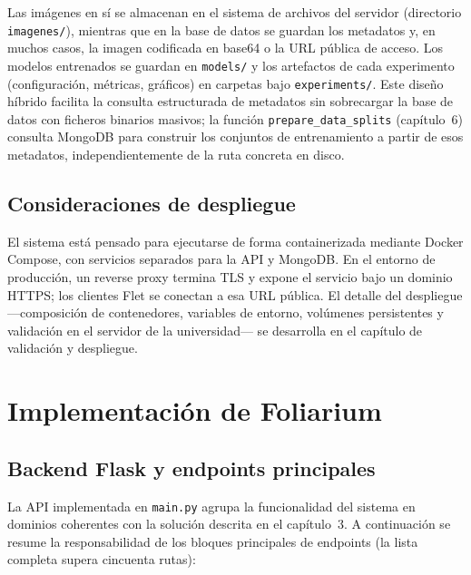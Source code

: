\documentclass[11pt,spanish,listoffigures,listoftables]{tfgetsinf}
\begin{document}
Las imágenes en sí se almacenan en el sistema de archivos del servidor (directorio \texttt{imagenes/}), mientras que en la base de datos se guardan los metadatos y, en muchos casos, la imagen codificada en base64 o la URL pública de acceso. Los modelos entrenados se guardan en \texttt{models/} y los artefactos de cada experimento (configuración, métricas, gráficos) en carpetas bajo \texttt{experiments/}. Este diseño híbrido facilita la consulta estructurada de metadatos sin sobrecargar la base de datos con ficheros binarios masivos; la función \texttt{prepare\_data\_splits} (capítulo~6) consulta MongoDB para construir los conjuntos de entrenamiento a partir de esos metadatos, independientemente de la ruta concreta en disco.

\section{Consideraciones de despliegue}

El sistema está pensado para ejecutarse de forma containerizada mediante Docker Compose, con servicios separados para la API y MongoDB. En el entorno de producción, un reverse proxy termina TLS y expone el servicio bajo un dominio HTTPS; los clientes Flet se conectan a esa URL pública. El detalle del despliegue ---composición de contenedores, variables de entorno, volúmenes persistentes y validación en el servidor de la universidad--- se desarrolla en el capítulo de validación y despliegue.

\chapter{Implementación de Foliarium}

\section{Backend Flask y endpoints principales}

La API implementada en \texttt{main.py} agrupa la funcionalidad del sistema en dominios coherentes con la solución descrita en el capítulo~3. A continuación se resume la responsabilidad de los bloques principales de endpoints (la lista completa supera cincuenta rutas):
\end{document}

